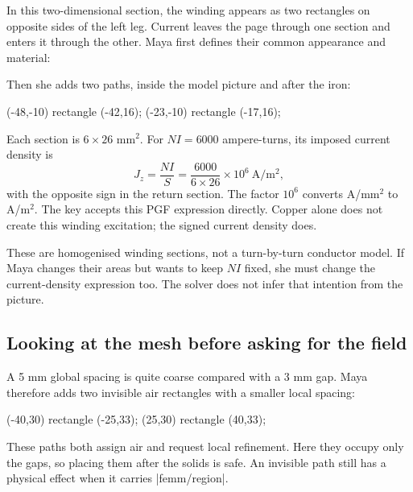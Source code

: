 In this two-dimensional section, the winding appears as two rectangles on
opposite sides of the left leg. Current leaves the page through one section
and enters it through the other. Maya first defines their common appearance
and material:
\begin{codeexample}
\end{codeexample}
Then she adds two paths, inside the model picture and after the iron:
\begin{codeexample}
\filldraw[winding,femm/current density=6000/(6*26)*1000000]
  (-48,-10) rectangle (-42,16);
\filldraw[winding,femm/current density=-6000/(6*26)*1000000]
  (-23,-10) rectangle (-17,16);
\end{codeexample}
Each section is $6\times26$ mm$^2$. For $NI=6000$ ampere-turns, its imposed
current density is
\[
 J_z=\frac{NI}{S}=\frac{6000}{6\times26}\times10^6\ \mathrm{A/m^2},
\]
with the opposite sign in the return section. The factor $10^6$ converts
A/mm$^2$ to A/m$^2$. The key accepts this PGF expression directly. Copper
alone does not create this winding excitation; the signed current density does.

These are homogenised winding sections, not a turn-by-turn conductor model.
If Maya changes their areas but wants to keep $NI$ fixed, she must change
the current-density expression too. The solver does not infer that intention
from the picture.

\subsection{Looking at the mesh before asking for the field}

A 5 mm global spacing is quite coarse compared with a 3 mm gap. Maya therefore
adds two invisible air rectangles with a smaller local spacing:
\begin{codeexample}
\end{codeexample}
\begin{codeexample}
 (-40,30) rectangle (-25,33);
 (25,30) rectangle (40,33);
\end{codeexample}
These paths both assign air and request local refinement. Here they occupy
only the gaps, so placing them after the solids is safe. An invisible path
still has a physical effect when it carries |femm/region|.

